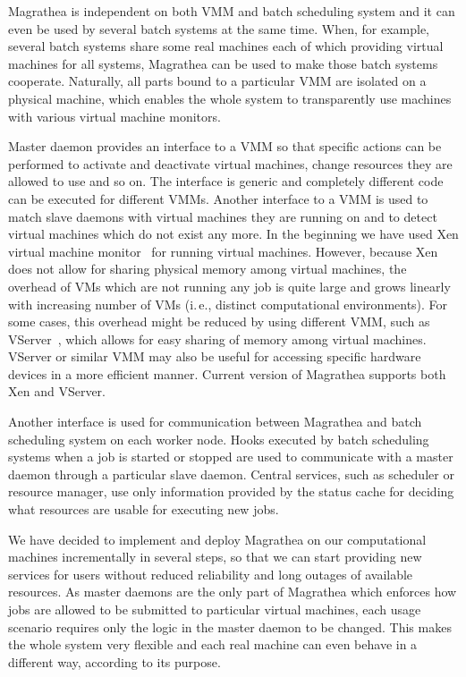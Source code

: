 \documentclass[times,10pt,twocolumn]{article}
\begin{document}

Magrathea is independent on both VMM and batch scheduling system and it can
even be used by several batch systems at the same time. When, for example,
several batch systems share some real machines each of which providing virtual
machines for all systems, Magrathea can be used to make those batch systems
cooperate. Naturally, all parts bound to a particular VMM are isolated on a
physical machine, which enables the whole system to transparently use machines
with various virtual machine monitors.

Master daemon provides an interface to a VMM so that specific actions can be
performed to activate and deactivate virtual machines, change resources they
are allowed to use and so on. The interface is generic and completely
different code can be executed for different VMMs. Another interface to a VMM
is used to match slave daemons with virtual machines they are running on and
to detect virtual machines which do not exist any more. In the beginning we
have used Xen virtual machine monitor~\cite{xen} for running virtual machines.
However, because Xen does not allow for sharing physical memory among virtual
machines, the overhead of VMs which are not running any job is quite large and
grows linearly with increasing number of VMs (i.\,e., distinct computational
environments). For some cases, this overhead might be reduced by using
different VMM, such as VServer~\cite{vserver}, which allows for easy sharing
of memory among virtual machines. VServer or similar VMM may also be useful
for accessing specific hardware devices in a more efficient manner. Current
version of Magrathea supports both Xen and VServer.

Another interface is used for communication between Magrathea and batch
scheduling system on each worker node. Hooks executed by batch scheduling
systems when a job is started or stopped are used to communicate with a master
daemon through a particular slave daemon. Central services, such as scheduler
or resource manager, use only information provided by the status cache for
deciding what resources are usable for executing new jobs.



We have decided to implement and deploy Magrathea on our computational
machines incrementally in several steps, so that we can start providing new
services for users without reduced reliability and long outages of available
resources. As master daemons are the only part of Magrathea which enforces how
jobs are allowed to be submitted to particular virtual machines, each usage
scenario requires only the logic in the master daemon to be changed. This
makes the whole system very flexible and each real machine can even behave in
a different way, according to its purpose.
\end{document}
